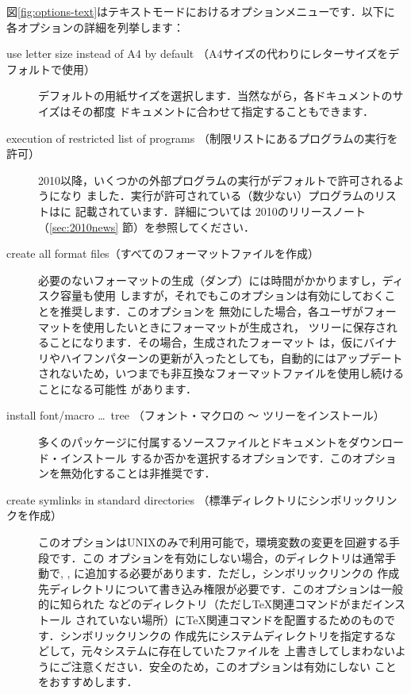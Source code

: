 \documentclass[uplatex,dvipdfmx]{jsarticle}
\begin{document}
図\ref{fig:options-text}はテキストモードにおけるオプションメニューです．以下に
各オプションの詳細を列挙します：
%
\begin{description}
\item[use letter size instead of A4 by default%
（A4サイズの代わりにレターサイズをデフォルトで使用）]
デフォルトの用紙サイズを選択します．当然ながら，各ドキュメントのサイズはその都度
ドキュメントに合わせて指定することもできます．

\item[execution of restricted list of programs%
（制限リストにあるプログラムの実行を許可）]
\TL{} 2010以降，いくつかの外部プログラムの実行がデフォルトで許可されるようになり
ました．実行が許可されている（数少ない）プログラムのリストはに
記載されています．詳細については\TL{} 2010のリリースノート（\ref{sec:2010news}%
節）を参照してください．

\item[create all format files（すべてのフォーマットファイルを作成）]
必要のないフォーマットの生成（ダンプ）には時間がかかりますし，ディスク容量も使用
しますが，それでもこのオプションは有効にしておくことを推奨します．このオプションを
無効にした場合，各ユーザがフォーマットを使用したいときにフォーマットが生成され，
ツリーに保存されることになります．その場合，生成されたフォーマット
は，仮にバイナリやハイフンパターンの更新が入ったとしても，自動的にはアップデート
されないため，いつまでも非互換なフォーマットファイルを使用し続けることになる可能性
があります．

\item[install font/macro \dots\ tree%
（フォント・マクロの 〜 ツリーをインストール）]
多くのパッケージに付属するソースファイルとドキュメントをダウンロード・インストール
するか否かを選択するオプションです．このオプションを無効化することは非推奨です．

\item[create symlinks in standard directories%
（標準ディレクトリにシンボリックリンクを作成）]
このオプションはUNIXのみで利用可能で，環境変数の変更を回避する手段です．この
オプションを有効にしない場合，\TL のディレクトリは通常手動で, , に追加する必要があります．ただし，シンボリックリンクの
作成先ディレクトリについて書き込み権限が必要です．このオプションは一般的に知られた
などのディレクトリ（ただし\TeX 関連コマンドがまだインストール
されていない場所）に\TeX 関連コマンドを配置するためのものです．シンボリックリンクの
作成先にシステムディレクトリを指定するなどして，元々システムに存在していたファイルを
上書きしてしまわないようにご注意ください．安全のため，このオプションは有効にしない
ことをおすすめします．


\end{description}
\end{document}
